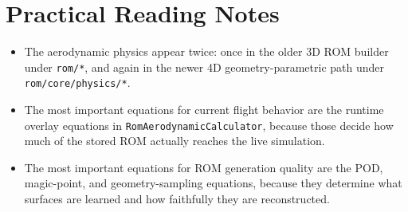 \documentclass[11pt]{article}
\begin{document}
\section{Practical Reading Notes}
\begin{itemize}
\item The aerodynamic physics appear twice: once in the older 3D ROM builder under \texttt{rom/*}, and again in the newer 4D geometry-parametric path under \texttt{rom/core/physics/*}.
\item The most important equations for current flight behavior are the runtime overlay equations in \texttt{RomAerodynamicCalculator}, because those decide how much of the stored ROM actually reaches the live simulation.
\item The most important equations for ROM generation quality are the POD, magic-point, and geometry-sampling equations, because they determine what surfaces are learned and how faithfully they are reconstructed.
\end{itemize}
\end{document}
